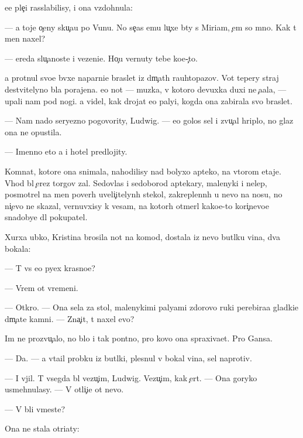 \documentclass[10pt]{book}
\begin{document}
{\Y}ee ple{\c}i rasslabilisy, i ona vzdohnula:

— {\Y}a toje o{\c}eny sku{\c}a{\y}u po V{\y}unu. No se{\y}{\c}as {\y}emu lu{\c}xe b{\yi}ty s Miriam, {\c}em so mno{\y}. Kak t{\yi} men{\ia} naxel?

— {\C}ereda slu{\c}a{\y}noste{\y} i vezeni{\y}e. Ho{\c}u vernuty tebe ko{\y}e-{\c}to.

{\Y}a prot{\ia}nul svo{\y}e{\y} b{\yi}vxe{\y} naparni{\q}e braslet iz d{\yi}m{\c}at{\yi}h rauhtopazov. Vot tepery straj de{\y}stvitelyno b{\yi}la porajena. {\y}e{\y}o not{\yi} — muz{\yi}ka, v kotoro{\y} devuxka duxi ne {\c}a{\y}ala, — upali nam pod nogi. {\Y}a videl, kak drojat {\y}e{\y}o paly{\q}i, kogda ona zabirala svo{\y} braslet.

— Nam nado seryezno pogovority, Ludwig. — {\y}e{\y}o golos sel i zvu{\c}al hriplo, no glaz ona ne opustila.

— Imenno eto {\y}a i hotel predlojity.



Komnat{\yi}, kotor{\yi}{\y}e ona snimala, nahodilisy nad bolyxo{\y} apteko{\y}, na vtorom etaje. Vhod b{\yi}l {\c}erez torgov{\yi}{\y} zal. Sedovlas{\yi}{\y} i sedoborod{\yi}{\y} aptekary, malenyki{\y} i nelep{\yi}{\y}, posmotrel na men{\ia} poverh uveli{\c}itelyn{\yi}h stekol, zakreplenn{\yi}h u nevo na nosu, no ni{\c}evo ne skazal, vernuvxisy k vesam, na kotor{\yi}h otmer{\ia}l kako{\y}e-to kori{\c}nevo{\y}e snadobye dl{\ia} pokupatel{\ia}.

Xurxa {\y}ubko{\y}, Kristina brosila not{\yi} na komod, dostala iz nevo but{\yi}lku vina, dva bokala:

— T{\yi} vs{\e} {\y}e{\x}o pyex krasno{\y}e?

— Vrem{\ia} ot vremeni.

— Otkro{\y}. — Ona sela za stol, malenykimi paly{\q}ami zdorovo{\y} ruki perebira{\y}a gladki{\y}e d{\yi}m{\c}at{\yi}{\y}e kamni. — Zna{\c}it, t{\yi} naxel {\y}evo?

Im{\ia} ne prozvu{\c}alo, no b{\yi}lo i tak pon{\ia}tno, pro kovo ona spraxiva{\y}et. Pro Gansa.

— Da. — {\Y}a v{\yi}ta{\x}il probku iz but{\yi}lki, plesnul v bokal{\yi} vina, sel naprotiv.

— I v{\yi}jil. T{\yi} vsegda b{\yi}l vezu{\c}im, Ludwig. Vezu{\c}im, kak {\c}ert. — Ona goryko usmehnulasy. — V otli{\c}i{\y}e ot nevo.

— V{\yi} b{\yi}li vmeste?

Ona ne stala otri{\q}aty:
\end{document}
